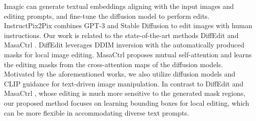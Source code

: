  Imagic \cite{kawar2023imagic} can generate textual embeddings
aligning with the input images and editing prompts, and
fine-tune the diffusion model to perform edits. InstructPix2Pix \cite{brooks2023instructpix2pix} combines GPT-3 \cite{brown2020language} and Stable Diffusion \cite{rombach2022high}
to edit images with human instructions. Our work is related to the state-of-the-art methods DiffEdit \cite{couairon2022diffedit} and MasaCtrl \cite{cao2023masactrl}. DiffEdit  \cite{couairon2022diffedit}  leverages DDIM inversion \cite{dhariwal2021diffusion, song2020denoising}with
the automatically produced masks for local image editing.
MasaCtrl \cite{cao2023masactrl} proposes mutual self-attention and learns the
editing masks from the cross-attention maps of the diffusion
models. Motivated by the aforementioned works, we also
utilize diffusion models and CLIP guidance for text-driven
image manipulation. In contrast to DiffEdit  \cite{couairon2022diffedit}  and MasaCtrl \cite{cao2023masactrl}, whose editing is much more sensitive to the generated mask regions, our proposed method focuses on learning bounding boxes for local editing, which can be more
flexible in accommodating diverse text prompts.

